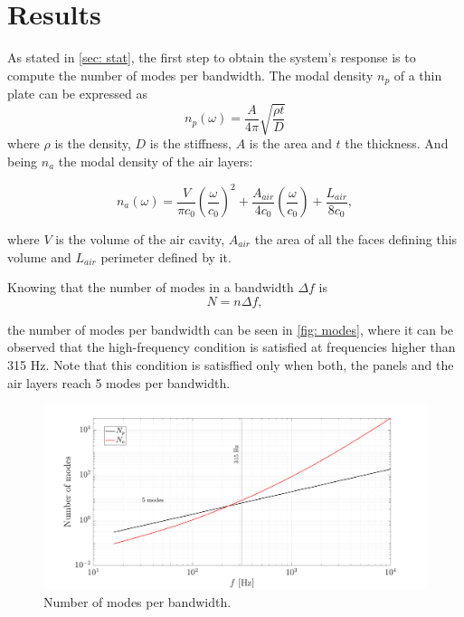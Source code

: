 \section{Results} \label{sec: res}

 As stated in \autoref{sec: stat}, the first step to obtain the system's response is to compute the number of modes per bandwidth. The modal density $n_p$ of a thin plate can be expressed as
 \begin{equation}
 n_p(\omega)=\frac{A}{4\pi}\sqrt{\frac{\rho t }{D}}
 \end{equation}
 where $\rho$ is the density, $D$ is the stiffness, $A$ is the area and $t$ the thickness. And being $n_a$ the modal density of the air layers:
 
 \begin{equation}
n_a(\omega)=\frac{V}{\pi c_0} \left(\frac{\omega}{c_0}\right)^2+\frac{A_{air}}{4 c_0}\left(\frac{\omega}{c_0}\right)+\frac{L_{air}}{8 c_0},
\end{equation}  

where $V$ is the volume of the air cavity, $A_{air}$ the area of all the faces defining this volume and $L_{air}$ perimeter defined by it.

Knowing that the number of modes in a bandwidth $\Delta f$ is 
\begin{equation}
N=n\Delta f ,
\end{equation}

the number of modes per bandwidth can be seen in \autoref{fig: modes}, where it can be observed that the high-frequency condition is satisfied at frequencies higher than 315 Hz. Note that this condition is satisffied only when both, the panels and the air layers reach 5 modes per bandwidth.

\begin{figure}[H]
    \centering
    \includegraphics[width=0.75\linewidth]{Figures/modes.png}
    \caption{Number of modes per bandwidth.}
    \label{fig: modes}
\end{figure}

